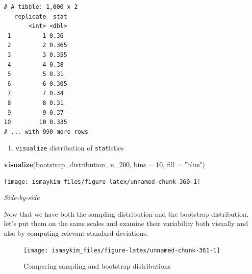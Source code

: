 \documentclass[12pt, krantz2,]{krantz}
\makeatletter
\newenvironment{Shaded}{\begin{snugshade}}{\end{snugshade}}
\newcommand{\DataTypeTok}[1]{\textcolor[rgb]{0.27,0.27,0.27}{#1}}
\newcommand{\DecValTok}[1]{\textcolor[rgb]{0.06,0.06,0.06}{#1}}
\newcommand{\KeywordTok}[1]{\textcolor[rgb]{0.27,0.27,0.27}{\textbf{#1}}}
\newcommand{\NormalTok}[1]{#1}
\newcommand{\OperatorTok}[1]{\textcolor[rgb]{0.43,0.43,0.43}{\textbf{#1}}}
\newcommand{\StringTok}[1]{\textcolor[rgb]{0.5,0.5,0.5}{#1}}
\providecommand{\tightlist}{%
  \setlength{\itemsep}{0pt}\setlength{\parskip}{0pt}}
\newenvironment{kframe}{%
\medskip{}
\setlength{\fboxsep}{.8em}
 \def\at@end@of@kframe{}%
 \ifinner\ifhmode%
  \def\at@end@of@kframe{\end{minipage}}%
  \begin{minipage}{\columnwidth}%
 \fi\fi%
 \def\FrameCommand##1{\hskip\@totalleftmargin \hskip-\fboxsep
 \colorbox{shadecolor}{##1}\hskip-\fboxsep
     \hskip-\linewidth \hskip-\@totalleftmargin \hskip\columnwidth}%
 \MakeFramed {\advance\hsize-\width
   \@totalleftmargin\z@ \linewidth\hsize
   \@setminipage}}%
 {\par\unskip\endMakeFramed%
 \at@end@of@kframe}
\renewenvironment{Shaded}{\begin{kframe}}{\end{kframe}}
\makeatother
\begin{document}
\begin{verbatim}
# A tibble: 1,000 x 2
   replicate  stat
       <int> <dbl>
 1         1 0.36 
 2         2 0.365
 3         3 0.355
 4         4 0.38 
 5         5 0.31 
 6         6 0.305
 7         7 0.34 
 8         8 0.31 
 9         9 0.37 
10        10 0.335
# ... with 990 more rows
\end{verbatim}

\begin{enumerate}
\def\labelenumi{\arabic{enumi}.}
\setcounter{enumi}{3}
\tightlist
\item
  \texttt{visualize} distribution of \texttt{stat}istics
\end{enumerate}

\begin{Shaded}
\begin{Highlighting}[]
\KeywordTok{visualize}\NormalTok{(bootstrap_distribution_n_}\DecValTok{200}\NormalTok{, }\DataTypeTok{bins =} \DecValTok{10}\NormalTok{, }\DataTypeTok{fill =} \StringTok{"blue"}\NormalTok{)}
\end{Highlighting}
\end{Shaded}

\begin{center}\texttt{[image: ismaykim\_files/figure-latex/unnamed-chunk-360-1]} \end{center}

\emph{Side-by-side}

Now that we have both the sampling distribution and the bootstrap distribution, let's put them on the same scales and examine their variability both visually and also by computing relevant standard deviations.

\begin{figure}

{\centering \texttt{[image: ismaykim\_files/figure-latex/unnamed-chunk-361-1]} 

}

\caption{Comparing sampling and bootstrap distributions}\label{fig:unnamed-chunk-361}
\end{figure}

\begin{Shaded}
\end{Shaded}
\end{document}
